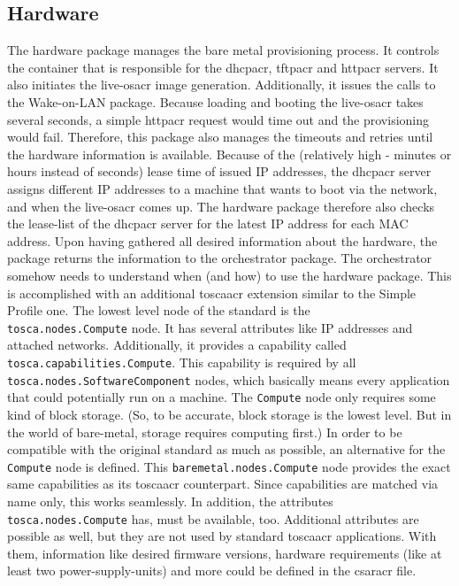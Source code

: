 \subsection{Hardware}
The hardware package manages the bare metal provisioning process. It controls the container that is responsible for the \gls{dhcpacr}, \gls{tftpacr} and \gls{httpacr} servers. It also initiates the live-\gls{osacr} image generation. Additionally, it issues the calls to the Wake-on-LAN package. Because loading and booting the live-\gls{osacr} takes several seconds, a simple \gls{httpacr} request would time out and the provisioning would fail. Therefore, this package also manages the timeouts and retries until the hardware information is available. Because of the (relatively high - minutes or hours instead of seconds) lease time of issued IP addresses, the \gls{dhcpacr} server assigns different IP addresses to a machine that wants to boot via the network, and when the live-\gls{osacr} comes up. The hardware package therefore also checks the lease-list of the \gls{dhcpacr} server for the latest IP address for each MAC address.
\newline
Upon having gathered all desired information about the hardware, the package returns the information to the orchestrator package.
\newline
The orchestrator somehow needs to understand when (and how) to use the hardware package. This is accomplished with an additional \gls{toscaacr} extension similar to the Simple Profile one. The lowest level node of the standard is the \\
\texttt{tosca.nodes.Compute} node. It has several attributes like IP addresses and attached networks. Additionally, it provides a capability called \texttt{tosca.capabilities.Compute}. This capability is required by all \texttt{tosca.nodes.SoftwareComponent} nodes, which basically means every application that could potentially run on a machine. The \texttt{Compute} node only requires some kind of block storage. (So, to be accurate, block storage is the lowest level. But in the world of bare-metal, storage requires computing first.)
\newline
In order to be compatible with the original standard as much as possible, an alternative for the \texttt{Compute} node is defined. This \texttt{baremetal.nodes.Compute} node provides the exact same capabilities as its \gls{toscaacr} counterpart. Since capabilities are matched via name only, this works seamlessly. In addition, the attributes \texttt{tosca.nodes.Compute} has, must be available, too. Additional attributes are possible as well, but they are not used by standard \gls{toscaacr} applications. With them, information like desired firmware versions, hardware requirements (like at least two power-supply-units) and more could be defined in the \gls{csaracr} file. 
